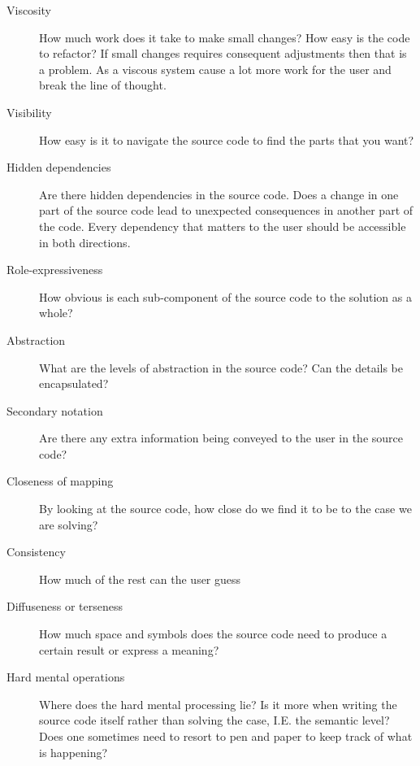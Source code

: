\begin{description}

\item[ Viscosity ]

How much work does it take to make small changes? How easy is the code to
refactor? If small changes requires consequent adjustments then that is a
problem. As a viscous system cause a lot more work for the user and break the
line of thought.

\item[ Visibility ]

How easy is it to navigate the source code to find the parts that you want?

\item[ Hidden dependencies ]

Are there hidden dependencies in the source code. Does a change in one part of
the source code lead to unexpected consequences in another part of the code.
Every dependency that matters to the user should be accessible in both
directions. 

\item[ Role-expressiveness ]

How obvious is each sub-component of the source code to the solution as a whole?

\item[ Abstraction ]

What are the levels of abstraction in the source code? Can the details be
encapsulated?

\item[ Secondary notation ]

Are there any extra information being conveyed to the user in the source code?

\item[ Closeness of mapping ]

By looking at the source code, how close do we find it to be to the case
we are solving?

\item[ Consistency ]

How much of the rest can the user guess 

\item[ Diffuseness or terseness ]

How much space and symbols does the source code need to produce a certain result
or express a meaning?

\item[ Hard mental operations ]

Where does the hard mental processing lie? Is it more when writing the source
code itself rather than solving the case, I.E. the semantic level? Does one
sometimes need to resort to pen and paper to keep track of what is happening?


\end{description}
